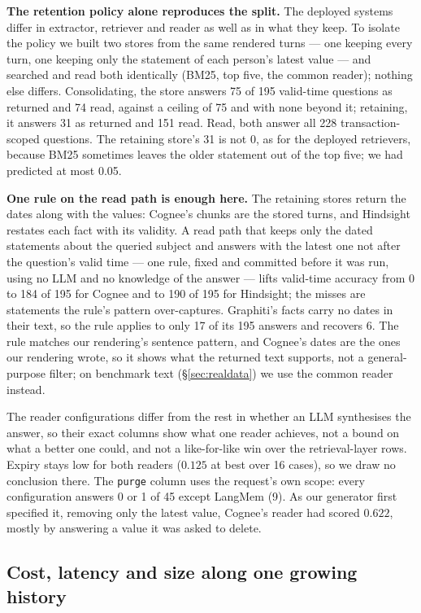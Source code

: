 \documentclass[conference]{IEEEtran}
\begin{document}
\textbf{The retention policy alone reproduces the split.} The deployed systems
differ in extractor, retriever and reader as well as in what they keep. To
isolate the policy we built two stores from the same rendered turns --- one
keeping every turn, one keeping only the statement of each person's latest
value --- and searched and read both identically (BM25, top five, the common
reader); nothing else differs. Consolidating, the store answers 75 of 195
valid-time questions as returned and 74 read, against a ceiling of 75 and with
none beyond it; retaining, it answers 31 as returned and 151 read. Read, both
answer all 228 transaction-scoped questions. The retaining store's 31 is not 0,
as for the deployed retrievers, because BM25 sometimes leaves the older statement
out of the top five; we had predicted at most 0.05.

\textbf{One rule on the read path is enough here.} The retaining stores return
the dates along with the values: Cognee's chunks are the stored turns, and
Hindsight restates each fact with its validity. A read path that keeps only the
dated statements about the queried subject and answers with the latest one not
after the question's valid time --- one rule, fixed and committed before it was
run, using no LLM and no knowledge of the answer --- lifts valid-time accuracy
from 0 to 184 of 195 for Cognee and to 190 of 195 for Hindsight; the misses are
statements the rule's pattern over-captures. Graphiti's facts carry no dates in
their text, so the rule applies to only 17 of its 195 answers and recovers 6.
The rule matches our rendering's sentence pattern, and Cognee's dates are the
ones our rendering wrote, so it shows what the returned text supports, not a
general-purpose filter; on benchmark text (\S\ref{sec:realdata}) we use the
common reader instead.

The reader configurations differ from the rest in whether an LLM synthesises the
answer, so their exact columns show what one reader achieves, not a bound on what
a better one could, and not a like-for-like win over the retrieval-layer rows. Expiry stays low
for both readers ($0.125$ at best over 16 cases), so we draw no conclusion there.
The \texttt{purge} column uses the request's own scope: every configuration
answers 0 or 1 of 45 except LangMem (9). As our generator first specified it,
removing only the latest value, Cognee's reader had scored $0.622$, mostly by
answering a value it was asked to delete.

\subsection{Cost, latency and size along one growing history}\label{sec:cost}
\end{document}
